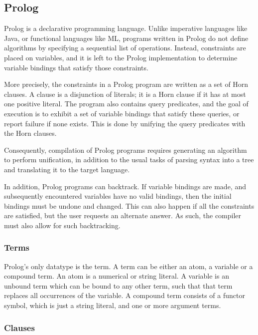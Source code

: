 \documentclass[12pt]{article}
\begin{document}
\subsection{Prolog}

Prolog is a declarative programming language. 
Unlike imperative languages like Java, or functional languages like ML, programs written in Prolog do not define algorithms by specifying a sequential list of operations. 
Instead, constraints are placed on variables, and it is left to the Prolog implementation to determine variable bindings that satisfy those constraints. 

More precisely, the constraints in a Prolog program are written as a set of Horn clauses. 
A clause is a disjunction of literals; it is a Horn clause if it has at most one positive literal. 
The program also contains query predicates, and the goal of execution is to exhibit a set of variable bindings that satisfy these queries, or report failure if none exists. 
This is done by unifying the query predicates with the Horn clauses.

Consequently, compilation of Prolog programs requires generating an algorithm to perform unification, in addition to the usual tasks of parsing syntax into a tree and translating it to the target language.

In addition, Prolog programs can backtrack. 
If variable bindings are made, and subsequently encountered variables have no valid bindings, then the initial bindings must be undone and changed. 
This can also happen if all the constraints are satisfied, but the user requests an alternate answer. 
As such, the compiler must also allow for such backtracking.

\subsubsection{Terms}

Prolog's only datatype is the term. 
A term can be either an atom, a variable or a compound term. 
An atom is a numerical or string literal. 
A variable is an unbound term which can be bound to any other term, such that that term replaces all occurrences of the variable. 
A compound term consists of a functor symbol, which is just a string literal, and one or more argument terms.

\subsubsection{Clauses}
\end{document}

